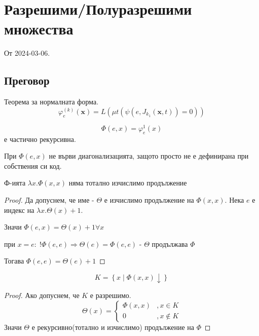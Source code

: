 \newpage
\section{Разрешими/Полуразрешими множества}
От 2024-03-06.
\subsection{Преговор}
\begin{theorem}
    Теорема за нормалната форма.
    \begin{equation*}
        \varphi_e^{(k)}(\textbf{x}) = L( \mu t( \psi(e, J_{k_1}( \textbf{x}, t )) = 0 ))
    \end{equation*}
\end{theorem}
\begin{notation}
    \begin{equation*}
        \Phi(e, x) = \varphi_e^1(x)
    \end{equation*}
    е частично рекурсивна.
\end{notation}
При $\Phi(e,x)$ не върви диагонализацията, защото просто не е дефинирана при собствения си код.
\begin{proposition}
    Ф-ията $\lambda x. \Phi(x, x)$ няма тотално изчислимо продължение
\end{proposition}
\begin{proof}
    Да допуснем, че име - $\Theta$ е изчислимо продължение на $\Phi(x, x)$. Нека $e$ е индекс на $\lambda x. \Theta(x) + 1$.

    Значи $\Phi(e, x) = \Theta(x) + 1 \forall x$

    при $x=e:\; !\Phi(e,e) \Rightarrow \Theta(e) = \Phi(e, e)$ - $\Theta$ продължава $\Phi$

    Тогава $\Phi(e, e) = \Theta(e) + 1$
\end{proof}
\begin{corollary}
    \begin{equation*}
        K = \left\{x \mid \Phi(x, x) \downarrow \right\}
    \end{equation*}
\end{corollary}
\begin{proof}
    Ако допуснем, че $K$ е разрешимо.
    \begin{equation*}
        \Theta(x) = \begin{cases}
            \Phi(x, x) & , x \in K \\
            0 & , x \notin K
        \end{cases}
    \end{equation*}
    Значи $\Theta$ е рекурсивно(тотално и изчислимо) продължение на $\Phi$
\end{proof}

